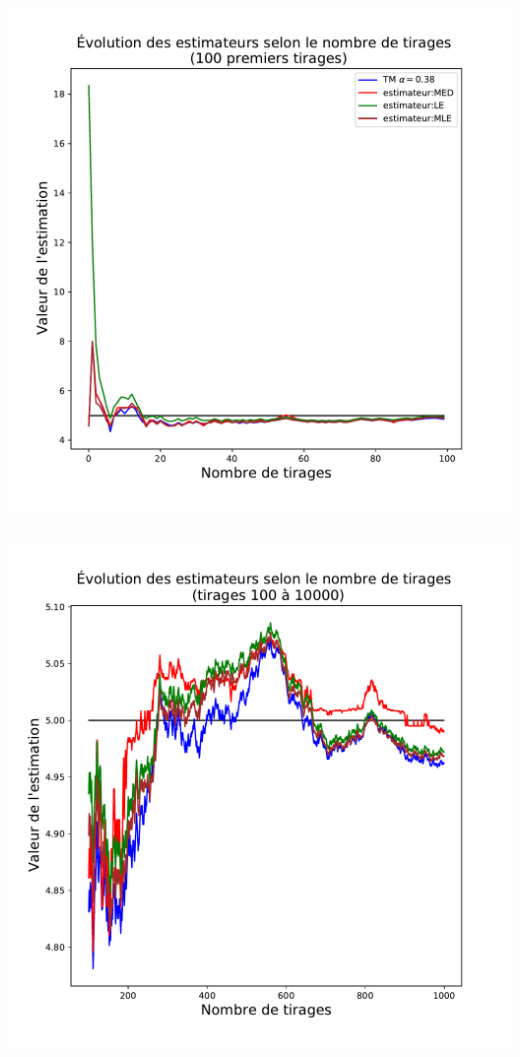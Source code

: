 \documentclass[8pt, sans]{beamer}
\begin{document}
\begin{frame}
\begin{columns}[T]
\begin{column}{0.5\linewidth}

\includegraphics[scale=0.2]{Est-100.pdf}

\end{column}

\end{columns}

\pause

\begin{columns}[T] %

\begin{column}{0.5\linewidth}

\includegraphics[scale=0.2]{Est-100-1000.pdf}


\end{column}
\end{columns}
\end{frame}
\end{document}
